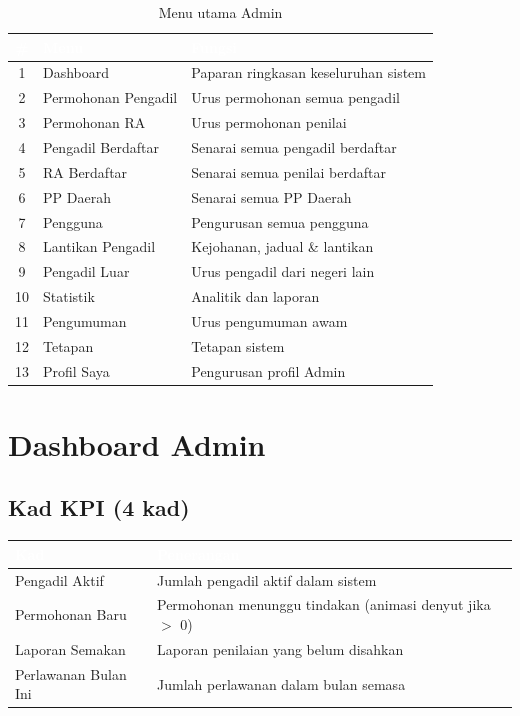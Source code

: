 \documentclass[12pt,a4paper]{report}
\begin{document}
\begin{table}[H]
\centering
{}
\begin{tabularx}{\textwidth}{c l X}
\toprule
\rowcolor{tableheader}
\textcolor{white}{\textbf{\#}} & \textcolor{white}{\textbf{Menu}} & \textcolor{white}{\textbf{Fungsi}} \\
\midrule
1 & Dashboard & Paparan ringkasan keseluruhan sistem \\
2 & Permohonan Pengadil & Urus permohonan semua pengadil \\
3 & Permohonan RA & Urus permohonan penilai \\
4 & Pengadil Berdaftar & Senarai semua pengadil berdaftar \\
5 & RA Berdaftar & Senarai semua penilai berdaftar \\
6 & PP Daerah & Senarai semua PP Daerah \\
7 & Pengguna & Pengurusan semua pengguna \\
8 & Lantikan Pengadil & Kejohanan, jadual \& lantikan \\
9 & Pengadil Luar & Urus pengadil dari negeri lain \\
10 & Statistik & Analitik dan laporan \\
11 & Pengumuman & Urus pengumuman awam \\
12 & Tetapan & Tetapan sistem \\
13 & Profil Saya & Pengurusan profil Admin \\
\bottomrule
\end{tabularx}
\caption{Menu utama Admin}
\end{table}

\section{Dashboard Admin}

\subsection{Kad KPI (4 kad)}
\begin{table}[H]
\centering
{}
\begin{tabularx}{\textwidth}{l X}
\toprule
\rowcolor{tableheader}
\textcolor{white}{\textbf{Kad}} & \textcolor{white}{\textbf{Penerangan}} \\
\midrule
Pengadil Aktif & Jumlah pengadil aktif dalam sistem \\
Permohonan Baru & Permohonan menunggu tindakan (animasi denyut jika $>$ 0) \\
Laporan Semakan & Laporan penilaian yang belum disahkan \\
Perlawanan Bulan Ini & Jumlah perlawanan dalam bulan semasa \\
\bottomrule
\end{tabularx}
\end{table}
\end{document}
